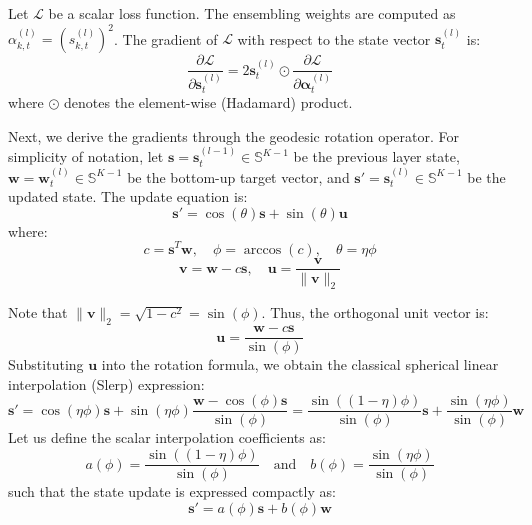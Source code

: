 \documentclass{article}
\theoremstyle{plain}
\theoremstyle{definition}
\theoremstyle{remark}
\begin{document}
Let $\mathcal{L}$ be a scalar loss function. The ensembling weights are computed as $\alpha_{k, t}^{(l)} = (s_{k, t}^{(l)})^2$. The gradient of $\mathcal{L}$ with respect to the state vector $\mathbf{s}_t^{(l)}$ is:
\begin{equation}
\frac{\partial \mathcal{L}}{\partial \mathbf{s}_t^{(l)}} = 2 \mathbf{s}_t^{(l)} \odot \frac{\partial \mathcal{L}}{\partial \boldsymbol{\alpha}_t^{(l)}}
\end{equation}
where $\odot$ denotes the element-wise (Hadamard) product.

Next, we derive the gradients through the geodesic rotation operator. For simplicity of notation, let $\mathbf{s} = \mathbf{s}_t^{(l-1)} \in \mathbb{S}^{K-1}$ be the previous layer state, $\mathbf{w} = \mathbf{w}_t^{(l)} \in \mathbb{S}^{K-1}$ be the bottom-up target vector, and $\mathbf{s}' = \mathbf{s}_t^{(l)} \in \mathbb{S}^{K-1}$ be the updated state.
The update equation is:
\begin{equation}
\mathbf{s}' = \cos(\theta) \mathbf{s} + \sin(\theta) \mathbf{u}
\end{equation}
where:
\begin{equation}
c = \mathbf{s}^T \mathbf{w}, \quad \phi = \arccos(c), \quad \theta = \eta \phi
\end{equation}
\begin{equation}
\mathbf{v} = \mathbf{w} - c \mathbf{s}, \quad \mathbf{u} = \frac{\mathbf{v}}{\|\mathbf{v}\|_2}
\end{equation}

Note that $\|\mathbf{v}\|_2 = \sqrt{1 - c^2} = \sin(\phi)$. Thus, the orthogonal unit vector is:
\begin{equation}
\mathbf{u} = \frac{\mathbf{w} - c \mathbf{s}}{\sin(\phi)}
\end{equation}
Substituting $\mathbf{u}$ into the rotation formula, we obtain the classical spherical linear interpolation (Slerp) expression:
\begin{equation}
\mathbf{s}' = \cos(\eta \phi) \mathbf{s} + \sin(\eta \phi) \frac{\mathbf{w} - \cos(\phi) \mathbf{s}}{\sin(\phi)} = \frac{\sin((1-\eta)\phi)}{\sin(\phi)} \mathbf{s} + \frac{\sin(\eta \phi)}{\sin(\phi)} \mathbf{w}
\end{equation}
Let us define the scalar interpolation coefficients as:
\begin{equation}
a(\phi) = \frac{\sin((1-\eta)\phi)}{\sin(\phi)} \quad \text{and} \quad b(\phi) = \frac{\sin(\eta \phi)}{\sin(\phi)}
\end{equation}
such that the state update is expressed compactly as:
\begin{equation}
\mathbf{s}' = a(\phi) \mathbf{s} + b(\phi) \mathbf{w}
\end{equation}
\end{document}
